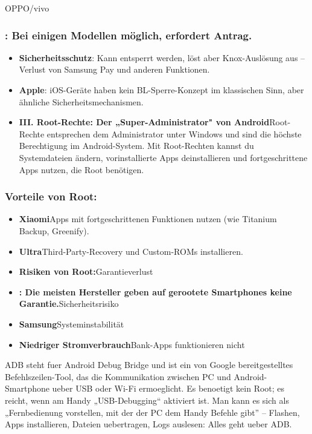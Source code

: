 
OPPO/vivo

\subsubsection*{: Bei einigen Modellen möglich, erfordert Antrag.}

\begin{itemize}
  \item \textbf{Sicherheitsschutz}: Kann entsperrt werden, löst aber Knox-Auslösung aus – Verlust von Samsung Pay und anderen Funktionen.
  \item \textbf{Apple}: iOS-Geräte haben kein BL-Sperre-Konzept im klassischen Sinn, aber ähnliche Sicherheitsmechanismen.
  \item \textbf{III. Root-Rechte: Der „Super-Administrator" von Android}Root-Rechte entsprechen dem Administrator unter Windows und sind die höchste Berechtigung im Android-System. Mit Root-Rechten kannst du Systemdateien ändern, vorinstallierte Apps deinstallieren und fortgeschrittene Apps nutzen, die Root benötigen.
\end{itemize}

\subsubsection*{Vorteile von Root:}

\begin{itemize}
  \item \textbf{Xiaomi}Apps mit fortgeschrittenen Funktionen nutzen (wie Titanium Backup, Greenify).
  \item \textbf{Ultra}Third-Party-Recovery und Custom-ROMs installieren.
  \item \textbf{Risiken von Root:}Garantieverlust
  \item \textbf{: Die meisten Hersteller geben auf gerootete Smartphones keine Garantie.}Sicherheitsrisiko
  \item \textbf{Samsung}Systeminstabilität
  \item \textbf{Niedriger Stromverbrauch}Bank-Apps funktionieren nicht
\end{itemize}


ADB steht fuer Android Debug Bridge und ist ein von Google bereitgestelltes Befehlszeilen-Tool, das die Kommunikation zwischen PC und Android-Smartphone ueber USB oder Wi-Fi ermoeglicht. Es benoetigt kein Root; es reicht, wenn am Handy „USB-Debugging“ aktiviert ist. Man kann es sich als „Fernbedienung vorstellen, mit der der PC dem Handy Befehle gibt” – Flashen, Apps installieren, Dateien uebertragen, Logs auslesen: Alles geht ueber ADB.

